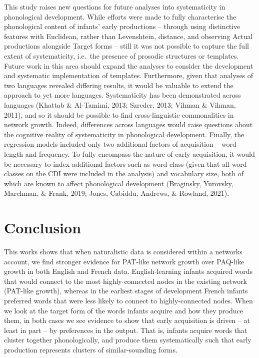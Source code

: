 \documentclass[
  english,
  man,floatsintext]{apa6}
\begin{document}
This study raises new questions for future analyses into systematicity in phonological development. While efforts were made to fully characterise the phonological content of infants' early productions -- through using distinctive features with Euclidean, rather than Levenshtein, distance, and observing Actual productions alongside Target forms -- still it was not possible to capture the full extent of systematicity, i.e.~the presence of prosodic structures or templates. Future work in this area should expand the analyses to consider the development and systematic implementation of templates. Furthermore, given that analyses of two languages revealed differing results, it would be valuable to extend the approach to yet more languages. Systematicity has been demonstrated across languages (Khattab \& Al-Tamimi, 2013; Szreder, 2013; Vihman \& Vihman, 2011), and so it should be possible to find cross-linguistic commonalities in network growth. Indeed, differences across languages would raise questions about the cognitive reality of systematicity in phonological development. Finally, the regression models included only two additional factors of acquisition -- word length and frequency. To fully encompass the nature of early acquisition, it would be necessary to index additional factors such as word class (given that all word classes on the CDI were included in the analysis) and vocabulary size, both of which are known to affect phonological development (Braginsky, Yurovsky, Marchman, \& Frank, 2019; Jones, Cabiddu, Andrews, \& Rowland, 2021).

\hypertarget{conclusion}{%
\section{Conclusion}\label{conclusion}}

This works shows that when naturalistic data is considered within a networks account, we find stronger evidence for PAT-like network growth over PAQ-like growth in both English and French data. English-learning infants acquired words that would connect to the most highly-connected nodes in the existing network (PAT-like growth), whereas in the earliest stages of development French infants preferred words that were less likely to connect to highly-connected nodes. When we look at the target form of the words infants acquire and how they produce them, in both cases we see evidence to show that early acquisition is driven -- at least in part -- by preferences in the output. That is, infants acquire words that cluster together phonologically, and produce them systematically such that early production represents clusters of similar-sounding forms.
\end{document}
